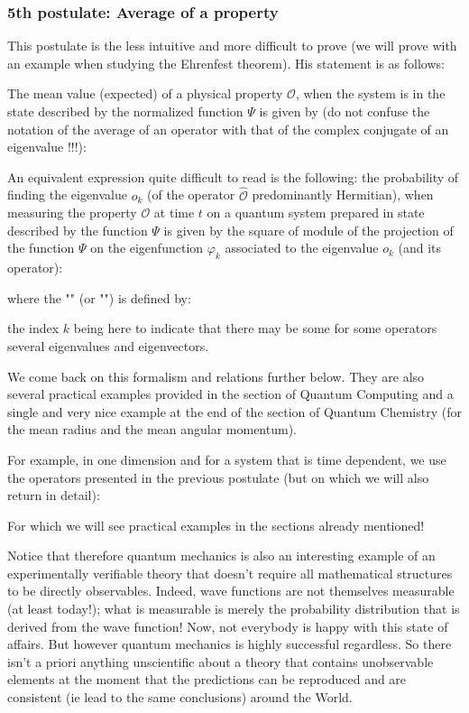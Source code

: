 	\subsubsection{5th postulate: Average of a property}\label{fifth postulate of wave quantum physics}
	This postulate is the less intuitive and more difficult to prove (we will prove with an example when studying the Ehrenfest theorem). His statement is as follows:

	The mean value (expected) of a physical property $\mathcal{O}$, when the system is in the state described by the normalized function $\Psi$ is given by (do not confuse the notation of the average of an operator with that of the complex conjugate of an eigenvalue !!!):
	
	An equivalent expression quite difficult to read is the following: the probability of finding the eigenvalue $o_k$ (of the operator $\hat{\mathcal{O}}$ predominantly Hermitian), when measuring the property $\mathcal{O}$ at time $t$ on a quantum system prepared in state described by the function $\Psi$ is given by the square of module of the projection of the function $\Psi$ on the eigenfunction $\varphi_k$ associated to the eigenvalue $o_k$ (and its operator):
	
	where the "" (or "") is defined by:
	
	the index $k$ being here to indicate that there may be some for some operators several eigenvalues and eigenvectors.
	\begin{tcolorbox}[title=Remark,colframe=black,arc=10pt]
	We come back on this formalism and relations further below. They are also several practical examples provided in the section of Quantum Computing and a single and very nice example at the end of the section of Quantum Chemistry (for the mean radius and the mean angular momentum).
	\end{tcolorbox}
	For example, in one dimension and for a system that is time dependent, we use the operators presented in the previous postulate (but on which we will also return in detail):
	
	For which we will see practical examples in the sections already mentioned!
	
	Notice that therefore quantum mechanics is also an interesting example of an experimentally verifiable theory that doesn't require all mathematical structures to be directly observables. Indeed, wave functions are not themselves measurable (at least today!); what is measurable is merely the probability distribution that is derived from the wave function! Now, not everybody is happy with this state of affairs. But however quantum mechanics is highly successful regardless. So there isn't a priori anything unscientific about a theory that contains unobservable elements at the moment that the predictions can be reproduced and are consistent (ie lead to the same conclusions) around the World.
	
